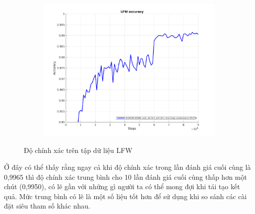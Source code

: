 \begin{figure}
    \begin{subfigure}{1\textwidth}
        \includegraphics[width=1\linewidth]{Chapters/items/accuracy.png}
        \label{fig:accuracy}
    \end{subfigure}
    \caption{Độ chính xác trên tập dữ liệu LFW}
\end{figure}

Ở đây có thể thấy rằng ngay cả khi độ chính xác trong lần đánh giá cuối cùng
là 0,9965 thì độ chính xác trung bình cho 10 lần đánh giá cuối cùng thấp
hơn một chút (0,9950), có lẽ gần với những gì người ta có thể mong đợi khi
tái tạo kết quả. Mức trung bình có lẽ là một số liệu tốt hơn để sử dụng khi
so sánh các cài đặt siêu tham số khác nhau.

